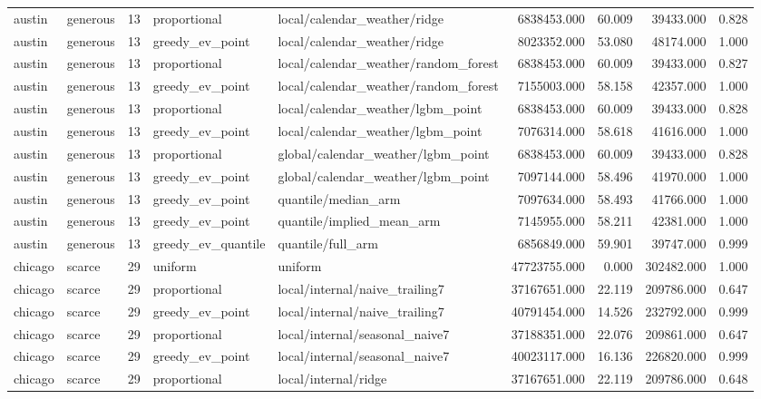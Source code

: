 \begin{tabular}{llrllrrrr}
austin & generous & 13 & proportional & local/calendar\_weather/ridge & 6838453.000 & 60.009 & 39433.000 & 0.828 \\
austin & generous & 13 & greedy\_ev\_point & local/calendar\_weather/ridge & 8023352.000 & 53.080 & 48174.000 & 1.000 \\
austin & generous & 13 & proportional & local/calendar\_weather/random\_forest & 6838453.000 & 60.009 & 39433.000 & 0.827 \\
austin & generous & 13 & greedy\_ev\_point & local/calendar\_weather/random\_forest & 7155003.000 & 58.158 & 42357.000 & 1.000 \\
austin & generous & 13 & proportional & local/calendar\_weather/lgbm\_point & 6838453.000 & 60.009 & 39433.000 & 0.828 \\
austin & generous & 13 & greedy\_ev\_point & local/calendar\_weather/lgbm\_point & 7076314.000 & 58.618 & 41616.000 & 1.000 \\
austin & generous & 13 & proportional & global/calendar\_weather/lgbm\_point & 6838453.000 & 60.009 & 39433.000 & 0.828 \\
austin & generous & 13 & greedy\_ev\_point & global/calendar\_weather/lgbm\_point & 7097144.000 & 58.496 & 41970.000 & 1.000 \\
austin & generous & 13 & greedy\_ev\_point & quantile/median\_arm & 7097634.000 & 58.493 & 41766.000 & 1.000 \\
austin & generous & 13 & greedy\_ev\_point & quantile/implied\_mean\_arm & 7145955.000 & 58.211 & 42381.000 & 1.000 \\
austin & generous & 13 & greedy\_ev\_quantile & quantile/full\_arm & 6856849.000 & 59.901 & 39747.000 & 0.999 \\
chicago & scarce & 29 & uniform & uniform & 47723755.000 & 0.000 & 302482.000 & 1.000 \\
chicago & scarce & 29 & proportional & local/internal/naive\_trailing7 & 37167651.000 & 22.119 & 209786.000 & 0.647 \\
chicago & scarce & 29 & greedy\_ev\_point & local/internal/naive\_trailing7 & 40791454.000 & 14.526 & 232792.000 & 0.999 \\
chicago & scarce & 29 & proportional & local/internal/seasonal\_naive7 & 37188351.000 & 22.076 & 209861.000 & 0.647 \\
chicago & scarce & 29 & greedy\_ev\_point & local/internal/seasonal\_naive7 & 40023117.000 & 16.136 & 226820.000 & 0.999 \\
chicago & scarce & 29 & proportional & local/internal/ridge & 37167651.000 & 22.119 & 209786.000 & 0.648 \\

\end{tabular}
